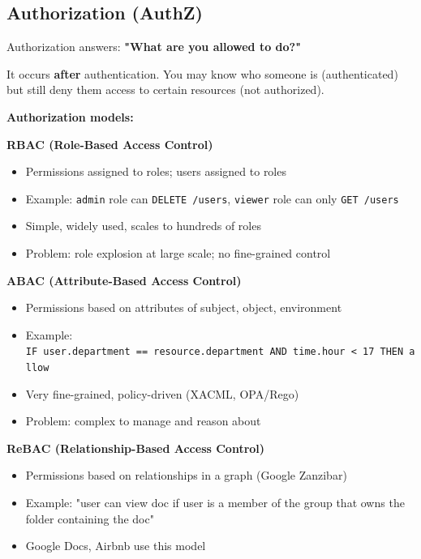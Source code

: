 \documentclass[11pt]{article}
\providecommand{\tightlist}{\setlength{\itemsep}{1pt}\setlength{\parskip}{0pt}}
\begin{document}
\subsection{Authorization (AuthZ)}\label{authorization-authz}

Authorization answers: \textbf{"What are you allowed to do?"}

It occurs \textbf{after} authentication. You may know who someone is (authenticated) but still deny them access to certain resources (not authorized).

\textbf{Authorization models:}

\textbf{RBAC (Role-Based Access Control)}

\begin{itemize}
\tightlist
\item
  Permissions assigned to roles; users assigned to roles
\item
  Example: \texttt{admin} role can \texttt{DELETE\ /users}, \texttt{viewer} role can only \texttt{GET\ /users}
\item
  Simple, widely used, scales to hundreds of roles
\item
  Problem: role explosion at large scale; no fine-grained control
\end{itemize}

\textbf{ABAC (Attribute-Based Access Control)}

\begin{itemize}
\tightlist
\item
  Permissions based on attributes of subject, object, environment
\item
  Example: \texttt{IF\ user.department\ ==\ resource.department\ AND\ time.hour\ \textless{}\ 17\ THEN\ allow}
\item
  Very fine-grained, policy-driven (XACML, OPA/Rego)
\item
  Problem: complex to manage and reason about
\end{itemize}

\textbf{ReBAC (Relationship-Based Access Control)}

\begin{itemize}
\tightlist
\item
  Permissions based on relationships in a graph (Google Zanzibar)
\item
  Example: "user can view doc if user is a member of the group that owns the folder containing the doc"
\item
  Google Docs, Airbnb use this model
\end{itemize}
\end{document}

